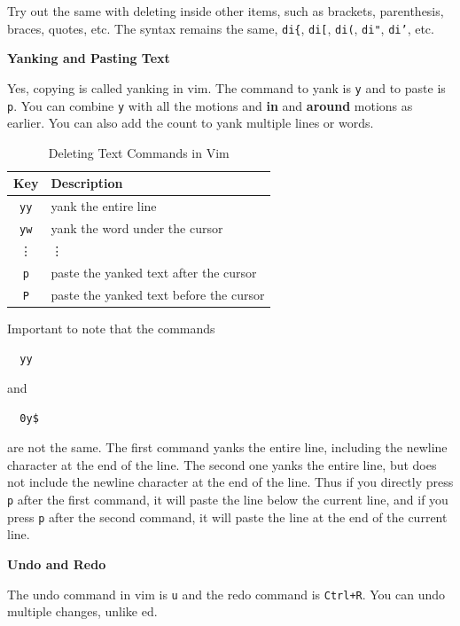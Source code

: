 Try out the same with deleting inside other items, such as
brackets, parenthesis, braces, quotes, etc. The syntax remains
the same, \texttt{di\{}, \texttt{di[}, \texttt{di(}, \texttt{di"}, \texttt{di'}, etc.

\textbf{Yanking and Pasting Text}

Yes, copying is called yanking in vim. The command to yank
is \texttt{y} and to paste is \texttt{p}.
You can combine \texttt{y} with all the motions and
\textbf{in} and \textbf{around} motions as earlier.
You can also add the count to yank multiple lines or words.

\begin{table}[h!]
  \caption{Deleting Text Commands in Vim}
  \begin{tabular}{c l}
    \toprule
    Key & Description \\
    \midrule
    \texttt{yy} & yank the entire line \\
    \texttt{yw} & yank the word under the cursor \\
    \vdots & \vdots \\
    \texttt{p} & paste the yanked text after the cursor \\
    \texttt{P} & paste the yanked text before the cursor \\
    \bottomrule
  \end{tabular}
\end{table}

\begin{remark}
  Important to note that the commands
  \begin{lstlisting}
  yy \end{lstlisting}
  and
  \begin{lstlisting}
  0y$ \end{lstlisting}
  are not the same. The first command yanks the entire line,
  including the newline character at the end of the line.
  The second one yanks the entire line, but does not include
  the newline character at the end of the line.
  Thus if you directly press \texttt{p} after the first command,
  it will paste the line below the current line, and if you
  press \texttt{p} after the second command, it will paste
  the line at the end of the current line.
\end{remark}

\textbf{Undo and Redo}

The undo command in vim is \texttt{u} and the redo command
is \texttt{Ctrl+R}. You can undo multiple changes, unlike ed.

